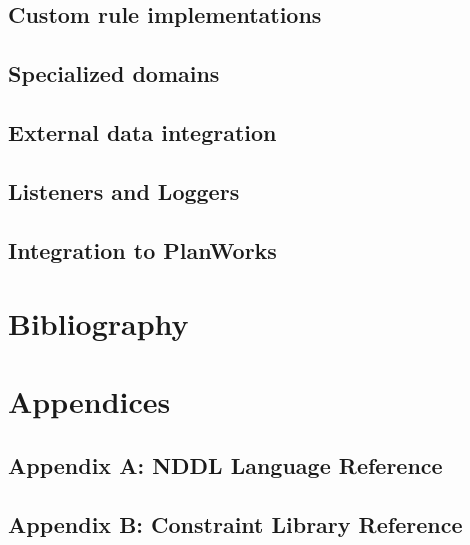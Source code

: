 \documentclass[10pt, letterpaper, twoside]{article}
\begin{document}
\subsection{Custom rule implementations}
\subsection{Specialized domains}
\subsection{External data integration}
\subsection{Listeners and Loggers}
\subsection{Integration to PlanWorks}

\section{Bibliography}

\section{Appendices}
\subsection{Appendix A: NDDL Language Reference}
\subsection{Appendix B: Constraint Library Reference}
\end{document}

